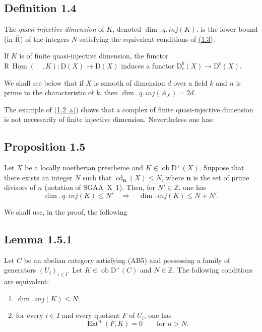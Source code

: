 \documentclass[11pt]{article}
\DeclareMathOperator{\Hom}{Hom}
\DeclareMathOperator{\Ext}{Ext}
\DeclareMathOperator{\cd}{cd}
\newcommand{\R}{\mathrm{R}}
\newcommand{\D}{\mathrm{D}}
\newcommand{\Z}{\mathbb{Z}}
\newcommand{\ob}{\operatorname{ob}}
\providecommand{\Hom}{\operatorname{Hom}}
\providecommand{\ob}{\operatorname{ob}}
\providecommand{\R}{\mathrm R}
\providecommand{\Z}{\mathbb Z}
\providecommand{\Hom}{\operatorname{Hom}}
\begin{document}
\subsection*{Definition 1.4}\label{sga5:I:definition:1.4}
The \emph{quasi-injective dimension} of $K$, denoted $\dim.\,q.\,inj(K)$, is the lower bound (in $\overline{\R}$) of the integers $N$ satisfying the equivalent conditions of \hyperref[sga5:I:proposition:1.3]{(1.3)}.

If $K$ is of finite quasi-injective dimension, the functor $\R\,\underline{\Hom}(\quad,K) : \D(X) \to \D(X)$ induces a functor $\D_c^{b}(X) \to \D^{b}(X)$.

We shall see below that if $X$ is smooth of dimension $d$ over a field $k$ and $n$ is prime to the characteristic of $k$, then $\dim.\,q.\,inj(A_X) = 2d$.

The example of (\hyperref[sga5:I:remark:1.2]{1.2~a)}) shows that a complex of finite quasi-injective dimension is not necessarily of finite injective dimension. Nevertheless one has:

\subsection*{Proposition 1.5}\label{sga5:I:proposition:1.5}
Let $X$ be a locally noetherian prescheme and $K \in \ob \D^{+}(X)$. Suppose that there exists an integer $N$ such that $\cd_{\mathbf{n}}(X) \leqslant N$, where $\mathbf{n}$ is the set of prime divisors of $n$ (notation of SGAA~X~1). Then, for $N' \in \Z$, one has
\[
\dim.\,q.\,inj(K) \leqslant N' \quad \Longrightarrow \quad \dim.\,inj(K) \leqslant N + N'.
\]

We shall use, in the proof, the following

\subsection*{Lemma 1.5.1}\label{sga5:I:lemma:1.5.1}
Let $C$ be an abelian category satisfying (AB5) and possessing a family of generators $(U_i)_{i \in I}$. Let $K \in \ob \D^{+}(C)$ and $N \in \Z$. The following conditions are equivalent:
\begin{enumerate}[label=(\roman*)]
\item $\dim.\,inj(K) \leqslant N$;
\item for every $i \in I$ and every quotient $F$ of $U_i$, one has
\[
\Ext^n(F,K) = 0 \qquad \text{for } n > N.
\]
\end{enumerate}
\end{document}
